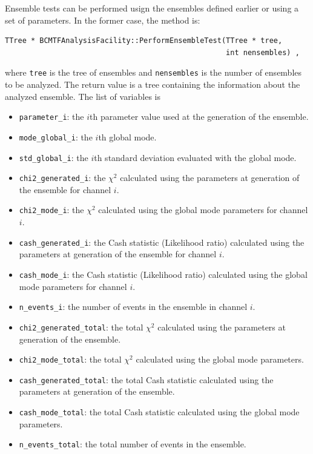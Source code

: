 \documentclass[11pt, a4paper]{article}
\begin{document}
Ensemble tests can be performed usign the ensembles defined earlier or
using a set of parameters. In the former case, the method is:
%
\begin{verbatim}
TTree * BCMTFAnalysisFacility::PerformEnsembleTest(TTree * tree,
                                                   int nensembles) ,
\end{verbatim}
%
where \verb|tree| is the tree of ensembles and \verb|nensembles| is
the number of ensembles to be analyzed. The return value is a tree
containing the information about the analyzed ensemble. The list of
variables is
%
\begin{itemize}
\item \verb|parameter_i|: the $i$th parameter value used at the
  generation of the ensemble.
\item \verb|mode_global_i|: the $i$th global mode.
\item \verb|std_global_i|: the $i$th standard deviation evaluated with
  the global mode.
\item \verb|chi2_generated_i|: the $\chi^{2}$ calculated using the
  parameters at generation of the ensemble for channel $i$.
\item \verb|chi2_mode_i|: the $\chi^{2}$ calculated using the
  global mode parameters for channel $i$.
\item \verb|cash_generated_i|: the Cash statistic (Likelihood ratio)
  calculated using the parameters at generation of the ensemble for
  channel $i$.
\item \verb|cash_mode_i|: the Cash statistic (Likelihood ratio)
  calculated using the global mode parameters for channel $i$.
\item \verb|n_events_i|: the number of events in the ensemble in
  channel $i$.
\item \verb|chi2_generated_total|: the total $\chi^{2}$ calculated
  using the parameters at generation of the ensemble.
\item \verb|chi2_mode_total|: the total $\chi^{2}$ calculated using
  the global mode parameters.
\item \verb|cash_generated_total|: the total Cash statistic calculated
  using the parameters at generation of the ensemble.
\item \verb|cash_mode_total|: the total Cash statistic calculated
  using the global mode parameters.
\item \verb|n_events_total|: the total number of events in the
  ensemble.
\end{itemize}
\end{document}
